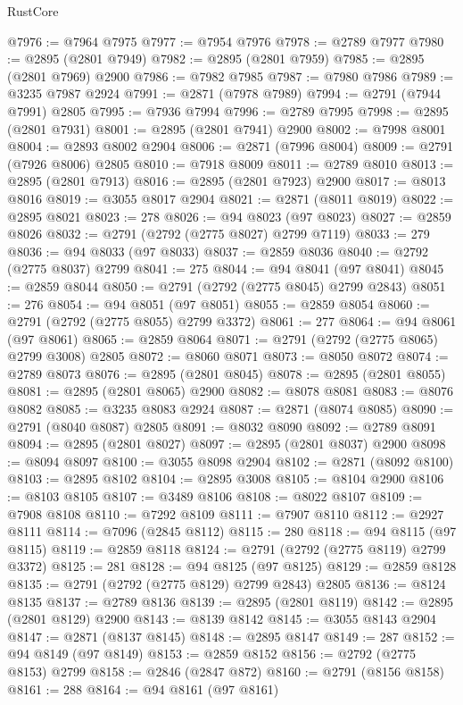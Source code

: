 \begin{lexlean}{RustCore}
\begin{coremodule}
@7976 := @7964 @7975
@7977 := @7954 @7976
@7978 := @2789 @7977
@7980 := @2895 (@2801 @7949)
@7982 := @2895 (@2801 @7959)
@7985 := @2895 (@2801 @7969) @2900
@7986 := @7982 @7985
@7987 := @7980 @7986
@7989 := @3235 @7987 @2924
@7991 := @2871 (@7978 @7989)
@7994 := @2791 (@7944 @7991) @2805
@7995 := @7936 @7994
@7996 := @2789 @7995
@7998 := @2895 (@2801 @7931)
@8001 := @2895 (@2801 @7941) @2900
@8002 := @7998 @8001
@8004 := @2893 @8002 @2904
@8006 := @2871 (@7996 @8004)
@8009 := @2791 (@7926 @8006) @2805
@8010 := @7918 @8009
@8011 := @2789 @8010
@8013 := @2895 (@2801 @7913)
@8016 := @2895 (@2801 @7923) @2900
@8017 := @8013 @8016
@8019 := @3055 @8017 @2904
@8021 := @2871 (@8011 @8019)
@8022 := @2895 @8021
@8023 := 278
@8026 := @94 @8023 (@97 @8023)
@8027 := @2859 @8026
@8032 := @2791 (@2792 (@2775 @8027) @2799 @7119)
@8033 := 279
@8036 := @94 @8033 (@97 @8033)
@8037 := @2859 @8036
@8040 := @2792 (@2775 @8037) @2799
@8041 := 275
@8044 := @94 @8041 (@97 @8041)
@8045 := @2859 @8044
@8050 := @2791 (@2792 (@2775 @8045) @2799 @2843)
@8051 := 276
@8054 := @94 @8051 (@97 @8051)
@8055 := @2859 @8054
@8060 := @2791 (@2792 (@2775 @8055) @2799 @3372)
@8061 := 277
@8064 := @94 @8061 (@97 @8061)
@8065 := @2859 @8064
@8071 := @2791 (@2792 (@2775 @8065) @2799 @3008) @2805
@8072 := @8060 @8071
@8073 := @8050 @8072
@8074 := @2789 @8073
@8076 := @2895 (@2801 @8045)
@8078 := @2895 (@2801 @8055)
@8081 := @2895 (@2801 @8065) @2900
@8082 := @8078 @8081
@8083 := @8076 @8082
@8085 := @3235 @8083 @2924
@8087 := @2871 (@8074 @8085)
@8090 := @2791 (@8040 @8087) @2805
@8091 := @8032 @8090
@8092 := @2789 @8091
@8094 := @2895 (@2801 @8027)
@8097 := @2895 (@2801 @8037) @2900
@8098 := @8094 @8097
@8100 := @3055 @8098 @2904
@8102 := @2871 (@8092 @8100)
@8103 := @2895 @8102
@8104 := @2895 @3008
@8105 := @8104 @2900
@8106 := @8103 @8105
@8107 := @3489 @8106
@8108 := @8022 @8107
@8109 := @7908 @8108
@8110 := @7292 @8109
@8111 := @7907 @8110
@8112 := @2927 @8111
@8114 := @7096 (@2845 @8112)
@8115 := 280
@8118 := @94 @8115 (@97 @8115)
@8119 := @2859 @8118
@8124 := @2791 (@2792 (@2775 @8119) @2799 @3372)
@8125 := 281
@8128 := @94 @8125 (@97 @8125)
@8129 := @2859 @8128
@8135 := @2791 (@2792 (@2775 @8129) @2799 @2843) @2805
@8136 := @8124 @8135
@8137 := @2789 @8136
@8139 := @2895 (@2801 @8119)
@8142 := @2895 (@2801 @8129) @2900
@8143 := @8139 @8142
@8145 := @3055 @8143 @2904
@8147 := @2871 (@8137 @8145)
@8148 := @2895 @8147
@8149 := 287
@8152 := @94 @8149 (@97 @8149)
@8153 := @2859 @8152
@8156 := @2792 (@2775 @8153) @2799
@8158 := @2846 (@2847 @872)
@8160 := @2791 (@8156 @8158)
@8161 := 288
@8164 := @94 @8161 (@97 @8161)

\end{coremodule}
\end{lexlean}
